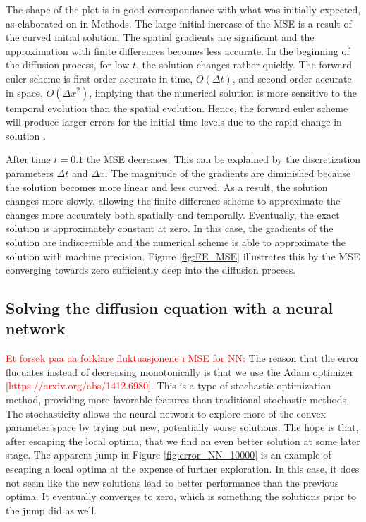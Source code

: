 \documentclass[12pt]{extarticle}
\begin{document}
\par The shape of the plot is in good correspondance with what was initially expected, as elaborated on in Methods. The large initial increase of the MSE is a result of the curved initial solution. The spatial gradients are significant and the approximation with finite differences becomes less accurate.
In the beginning of the diffusion process, for low $t$, the solution changes rather quickly. The forward euler scheme is first order accurate in time, $O(\Delta t)$, and second order accurate in space, $O(\Delta x^2)$, implying that the numerical solution is more sensitive to the temporal evolution than the spatial evolution. Hence, the forward euler scheme will produce larger errors for the initial time levels due to the rapid change in solution \cite{Linge2017}.
\par After time $t=0.1$ the MSE decreases. This can be explained by the discretization parameters $\Delta t$ and $\Delta x$. The magnitude of the gradients are diminished because the solution becomes more linear and less curved. As a result, the solution changes more slowly, allowing the finite difference scheme to approximate the changes more accurately both spatially and temporally. Eventually, the exact solution is approximately constant at zero. In this case, the gradients of the solution are indiscernible and the numerical scheme is able to approximate the solution with machine precision. Figure \ref{fig:FE_MSE} illustrates this by the MSE converging towards zero sufficiently deep into the diffusion process.

\subsection{Solving the diffusion equation with a neural network}

\par \textcolor{red}{Et forsøk paa aa forklare fluktuasjonene i MSE for NN:} The reason that the error flucuates instead of decreasing monotonically is that we use the Adam optimizer [\textcolor{red}{https://arxiv.org/abs/1412.6980}]. This is a type of stochastic optimization method, providing more favorable features than traditional stochastic methods. The stochasticity allows the neural network to explore more of the convex parameter space by trying out new, potentially worse solutions. The hope is that, after escaping the local optima, that we find an even better solution at some later stage. The apparent jump in Figure \ref{fig:error_NN_10000} is an example of escaping a local optima at the expense of further exploration. In this case, it does not seem like the new solutions lead to better performance than the previous optima. It eventually converges to zero, which is something the solutions prior to the jump did as well. 
\end{document}
